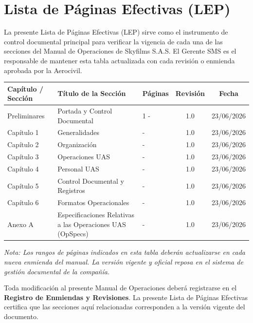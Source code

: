 \section*{Lista de Páginas Efectivas (LEP)}


La presente Lista de Páginas Efectivas (LEP) sirve como el instrumento de control documental principal para verificar la vigencia de cada una de las secciones del Manual de Operaciones de Skyfilms S.A.S. El Gerente SMS es el responsable de mantener esta tabla actualizada con cada revisión o enmienda aprobada por la Aerocivil.

\begin{table}[h]
    \centering
    \renewcommand{\arraystretch}{1.3}
    \begin{tabular}{|p{2.6cm}|p{5.8cm}|p{2.2cm}|c|c|}
        \hline
        \rowcolor[gray]{0.8}
        \textbf{Capítulo / Sección} & \textbf{Título de la Sección} & \textbf{Páginas} & \textbf{Revisión} & \textbf{Fecha} \\ \hline
        Preliminares & Portada y Control Documental & 1 - \pageref{fin_prelim} & 1.0 & 23/06/2026 \\ \hline
        Capítulo 1 & Generalidades & \pageref{inicio_cap1} - \pageref{fin_cap1} & 1.0 & 23/06/2026 \\ \hline
        Capítulo 2 & Organización & \pageref{inicio_cap2} - \pageref{fin_cap2} & 1.0 & 23/06/2026 \\ \hline
        Capítulo 3 & Operaciones UAS & \pageref{inicio_cap3} - \pageref{fin_cap3} & 1.0 & 23/06/2026 \\ \hline
        Capítulo 4 & Personal UAS & \pageref{inicio_cap4} - \pageref{fin_cap4} & 1.0 & 23/06/2026 \\ \hline
        Capítulo 5 & Control Documental y Registros & \pageref{inicio_cap5} - \pageref{fin_cap5} & 1.0 & 23/06/2026 \\ \hline
        Capítulo 6 & Formatos Operacionales & \pageref{inicio_cap6} - \pageref{fin_cap6} & 1.0 & 23/06/2026 \\ \hline
        Anexo A & Especificaciones Relativas a las Operaciones UAS (OpSpecs) & \pageref{inicio_anexo} - \pageref{fin_anexos} & 1.0 & 23/06/2026 \\ \hline
    \end{tabular}
\end{table}

\textit{Nota: Los rangos de páginas indicados en esta tabla deberán actualizarse en cada nueva enmienda del manual. La versión vigente y oficial reposa en el sistema de gestión documental de la compañía.}



\vspace{0.4cm}

\begin{tcolorbox}[
colback=gray!5,
colframe=black,
title=Control de Vigencia]

Toda modificación al presente Manual de Operaciones deberá registrarse en el \textbf{Registro de Enmiendas y Revisiones}. La presente Lista de Páginas Efectivas certifica que las secciones aquí relacionadas corresponden a la versión vigente del documento.

\end{tcolorbox}